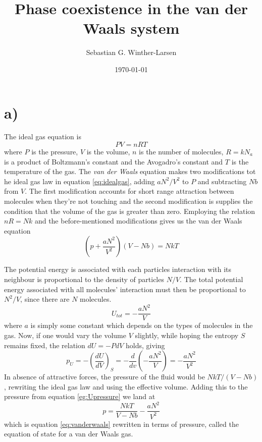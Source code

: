\documentclass{article}
\title{Phase coexistence in the van der Waals system}
\author{Sebastian G. Winther-Larsen}
\date{\today}
\begin{document}
\maketitle

\section*{a)}
The ideal gas equation is 
\begin{equation}
\label{eq:idealgas}
PV = nRT
\end{equation}
where $P$ is the pressure, $V$ is the volume, $n$ is the number of molecules, $R=kN_a$ is a product of Boltzmann's constant and the Avogadro's constant and $T$ is the temperature of the gas. The \emph{van der Waals} equation makes two modifications tot he ideal gas law in equation \ref{eq:idealgas}, adding $aN^2/V^2$ to $P$ and subtracting $Nb$ from $V$. The first modification accounts for short range attraction between molecules when they're not touching and the second modification is supplies the condition that the volume of the gas is greater than zero. Employing the relation $nR=Nk$ and the before-mentioned modifications gives us the van der Waals equation
\begin{equation}
\label{eq:vanderwaals}
\left(p + \frac{aN^2}{V^2}\right)(V-Nb) = NkT
\end{equation}

The potential energy is associated with each particles interaction with its neighbour is proportional to the density of particles $N/V$. The total potential energy associated with all molecules' interaction must then be proportional to $N^2/V$, since there are $N$ molecules.
\begin{equation}
U_{tot} = -\frac{aN^2}{V}
\end{equation}
where $a$ is simply some constant which depends on the types of molecules in the gas. Now, if one would vary the volume $V$ slightly, while hoping the entropy $S$ remains fixed, the relation $dU = -PdV$ holds, giving
\begin{equation}
\label{eg:Upressure}
p_{U} = -\left(\frac{dU}{dV}\right)_S = -\frac{d}{dv}\left(-\frac{aN^2}{V} \right) = -\frac{aN^2}{V^2}
\end{equation}
In absence of attractive forces, the pressure of the fluid would be $NkT/(V-Nb)$, rewriting the ideal gas law and using the effective volume. Adding this to the pressure from equation \ref{eg:Upressure} we land at  
\begin{equation}
\label{eq:vdwpressure}
p = \frac{NkT}{V-Nb}-\frac{aN^2}{V^2}
\end{equation}
which is equation \ref{eq:vanderwaals} rewritten in terms of pressure, called the equation of state for a van der Waals gas.
\end{document}
